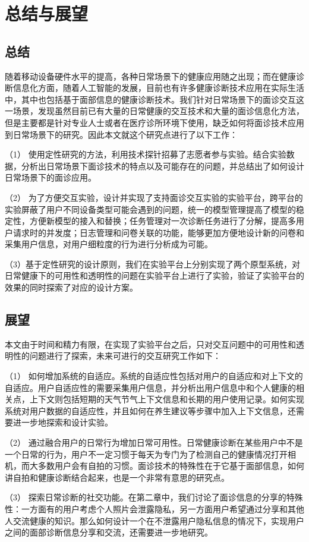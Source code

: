 \chapter{总结与展望}
\section{总结}
随着移动设备硬件水平的提高，各种日常场景下的健康应用随之出现；而在健康诊断信息化方面，随着人工智能的发展，目前也有许多健康诊断技术应用在实际生活中，其中也包括基于面部信息的健康诊断技术。我们针对日常场景下的面诊交互这一场景，发现虽然目前已有大量的日常健康的交互技术和大量的面诊信息化方法，但是主要都是针对专业人士或者在医疗诊所环境下使用，缺乏如何将面诊技术应用到日常场景下的研究。因此本文就这个研究点进行了以下工作：

（1） 使用定性研究的方法，利用技术探针招募了志愿者参与实验。结合实验数据，分析出日常场景下面诊技术的特点以及可能存在的问题，并总结出了如何设计日常场景下的面诊应用。

（2） 为了方便交互实验，设计并实现了支持面诊交互实验的实验平台，跨平台的实验屏蔽了用户不同设备类型可能会遇到的问题，统一的模型管理提高了模型的稳定性，方便新模型的接入和替换；任务管理对一次诊断任务进行了分解，提高多用户请求时的并发度；日志管理和问卷关联的功能，能够更加方便地设计新的问卷和采集用户信息，对用户细粒度的行为进行分析成为可能。

（3）基于定性研究的设计原则，我们在实验平台上分别实现了两个原型系统，对日常健康下的可用性和透明性的问题在实验平台上进行了实验，验证了实验平台的效果的同时探索了对应的设计方案。



\section{展望}
本文由于时间和精力有限，在实现了实验平台之后，只对交互问题中的可用性和透明性的问题进行了探索，未来可进行的交互研究工作如下：

（1） 如何增加系统的自适应。系统的自适应性包括对用户的自适应和对上下文的自适应。用户自适应性的需要采集用户信息，并分析出用户信息中和个人健康的相关点，上下文则包括短期的天气节气上下文信息和长期的用户使用记录。如何实现系统对用户数据的自适应性，并且如何在养生建议等步骤中加入上下文信息，还需要进一步地探索和设计实验。

（2） 通过融合用户的日常行为增加日常可用性。日常健康诊断在某些用户中不是一个日常的行为，用户不一定习惯于每天为专门为了检测自己的健康情况打开相机，而大多数用户会有自拍的习惯。面诊技术的特殊性在于它基于面部信息，如何讲自拍和健康诊断结合起来，也是一个非常有意思的研究点。

（3） 探索日常诊断的社交功能。在第二章中，我们讨论了面诊信息的分享的特殊性：一方面有的用户考虑个人照片会泄露隐私，另一方面用户希望通过分享和其他人交流健康的知识。那么如何设计一个在不泄露用户隐私信息的情况下，实现用户之间的面部诊断信息分享和交流，还需要进一步地研究。

